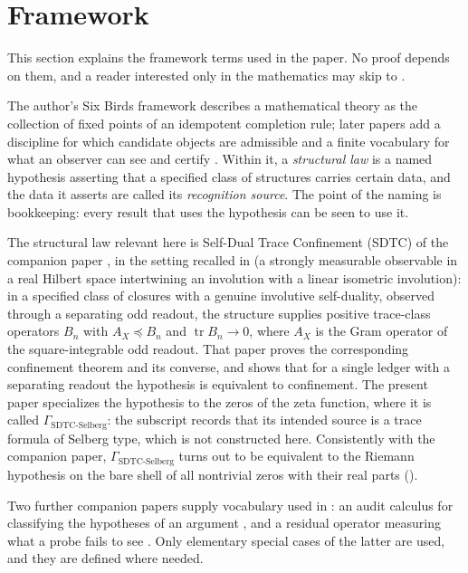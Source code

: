 \documentclass[11pt]{article}
\DeclareMathOperator{\trace}{tr}
\newcommand{\GamSDTCSelberg}{\Gamma_{\mathrm{SDTC\text{-}Selberg}}}
\newcommand{\AX}{A_{X}}
\theoremstyle{definition}
\begin{document}
 \section{Framework}
\label{sec:framework}

This section explains the framework terms used in the paper.  No
proof depends on them, and a reader interested only in the
mathematics may skip to .

The author's Six Birds framework \citep{TsiokosFoundationsI2026}
describes a mathematical theory as the collection of fixed points of
an idempotent completion rule; later papers add a discipline for which
candidate objects are admissible \citep{TsiokosFoundationsII2026} and
a finite vocabulary for what an observer can see and certify
\citep{TsiokosFoundationsIII2026}.  Within it, a \emph{structural law}
is a named hypothesis asserting that a specified class of structures
carries certain data, and the data it asserts are called its
\emph{recognition source}.  The point of the naming is bookkeeping:
every result that uses the hypothesis can be seen to use it.

The structural law relevant here is Self-Dual Trace Confinement
(SDTC) of the companion paper \citep{TsiokosSDTC2026}, in the setting
recalled in  (a strongly measurable observable in a
real Hilbert space intertwining an involution with a linear isometric
involution): in a specified class of closures with a genuine involutive self-duality, observed
through a separating odd readout, the structure supplies positive trace-class operators \(B_n\) with
\(\AX\preceq B_n\) and \(\trace B_n\to0\), where \(\AX\) is the Gram
operator of the square-integrable odd readout.
That paper proves the corresponding confinement theorem and its
converse, and shows that for a single ledger with a separating readout
the hypothesis is equivalent to confinement.  The present paper
specializes the hypothesis to the zeros of the zeta function, where it
is called \(\GamSDTCSelberg\): the subscript records that its intended
source is a trace formula of Selberg type, which is not constructed
here.  Consistently with the companion paper, \(\GamSDTCSelberg\) turns out to be equivalent to the Riemann hypothesis
on the bare shell of all nontrivial zeros with their real parts
().

Two further companion papers supply vocabulary used in
: an audit calculus for
classifying the hypotheses of an argument \citep{TsiokosAOR2026}, and
a residual operator measuring what a probe fails to see
\citep{TsiokosXiCompanion2026}.  Only elementary special cases of the
latter are used, and they are defined where needed.
\end{document}
